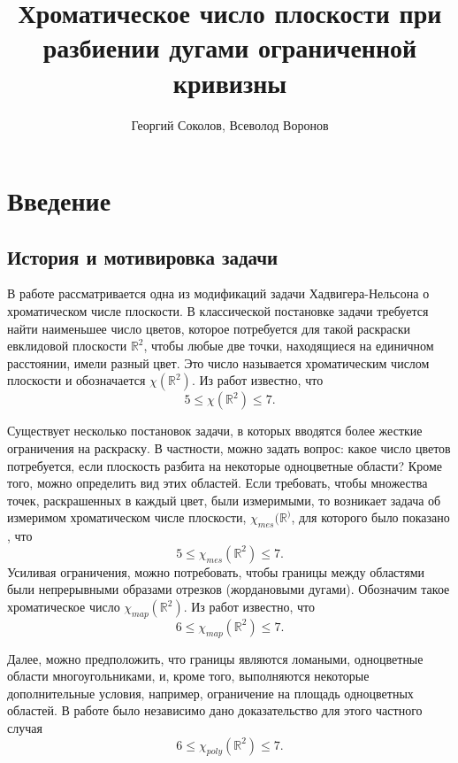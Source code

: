 \documentclass[12pt,a4paper]{article}
\title{\large\bf Хроматическое число плоскости при разбиении дугами ограниченной кривизны}
\author{Георгий Соколов, Всеволод Воронов}
\begin{document}
	\maketitle
	\vspace{20 pt}

\begin{abstract}
\end{abstract}

\section{Введение}

\subsection{История и мотивировка задачи}

В работе рассматривается одна из модификаций задачи Хадвигера-Нельсона о хроматическом числе плоскости. В классической постановке задачи требуется найти наименьшее число цветов, которое потребуется для такой раскраски евклидовой плоскости $\mathbb{R}^2$, чтобы любые две точки, находящиеся на единичном расстоянии, имели разный цвет. Это число называется хроматическим числом плоскости и обозначается $\chi(\mathbb{R}^2)$. Из работ \cite{deGrey} известно, что
\[
    5 \leq \chi(\mathbb{R}^2) \leq 7.
\]

Существует несколько постановок задачи, в которых вводятся более жесткие ограничения на раскраску. В частности, можно задать вопрос: какое число цветов потребуется, если плоскость разбита на некоторые одноцветные области? Кроме того, можно определить вид этих областей. Если требовать, чтобы множества точек, раскрашенных в каждый цвет, были измеримыми, то возникает задача об измеримом хроматическом числе плоскости, $\chi_{mes}(\mathbb{R}^)$, для которого было показано \cite{falconer1981realization}, что 
\[
    5 \leq \chi_{mes}(\mathbb{R}^2) \leq 7.    
\]
Усиливая ограничения, можно потребовать, чтобы границы между областями были непрерывными образами отрезков (жордановыми дугами). Обозначим такое хроматическое число $\chi_{map}(\mathbb{R}^2)$. Из работ \cite{wormald,townsend2005colouring} известно, что
\[
    6 \leq \chi_{map}(\mathbb{R}^2) \leq 7.    
\]

Далее, можно предположить, что границы являются ломаными, одноцветные области многоугольниками, и, кроме того, выполняются некоторые дополнительные условия, например, ограничение на площадь одноцветных областей. В работе \cite{coulson2004chromatic} было независимо дано доказательство для этого частного случая 
\[
    6 \leq \chi_{poly}(\mathbb{R}^2) \leq 7.    
\]
\end{document}
